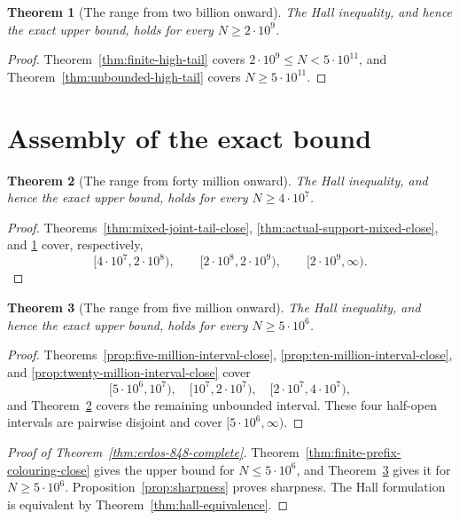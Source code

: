 \documentclass[11pt]{article}
\newtheorem{theorem}{Theorem}[section]
\theoremstyle{definition}
\newcommand{\FiveMillion}{5\cdot10^6}
\newcommand{\TenMillion}{10^7}
\newcommand{\TwentyMillion}{2\cdot10^7}
\newcommand{\FortyMillion}{4\cdot10^7}
\newcommand{\TwoHundredMillion}{2\cdot10^8}
\newcommand{\TwoBillion}{2\cdot10^9}
\newcommand{\FiveHundredBillion}{5\cdot10^{11}}
\begin{document}
\begin{theorem}[The range from two billion onward]\label{thm:formal-high-tail-close}
The Hall inequality, and hence the exact upper bound, holds for every
$N\geq\TwoBillion$.
\end{theorem}

\begin{proof}
Theorem~\ref{thm:finite-high-tail} covers
$\TwoBillion\leq N<\FiveHundredBillion$, and
Theorem~\ref{thm:unbounded-high-tail} covers
$N\geq\FiveHundredBillion$.
\end{proof}

\section{Assembly of the exact bound}

\begin{theorem}[The range from forty million onward]
\label{thm:forty-million-tail-assembly}
The Hall inequality, and hence the exact upper bound, holds for every
$N\geq\FortyMillion$.
\end{theorem}

\begin{proof}
Theorems~\ref{thm:mixed-joint-tail-close},
\ref{thm:actual-support-mixed-close}, and
\ref{thm:formal-high-tail-close} cover, respectively,
\[
 [\FortyMillion,\TwoHundredMillion),\qquad
 [\TwoHundredMillion,\TwoBillion),\qquad
 [\TwoBillion,\infty).
\]
\end{proof}

\begin{theorem}[The range from five million onward]
\label{thm:mixed-cell-five-million-close}
The Hall inequality, and hence the exact upper bound, holds for every
$N\geq\FiveMillion$.
\end{theorem}

\begin{proof}
Theorems~\ref{prop:five-million-interval-close},
\ref{prop:ten-million-interval-close}, and
\ref{prop:twenty-million-interval-close} cover
\[
 [\FiveMillion,\TenMillion),\quad
 [\TenMillion,\TwentyMillion),\quad
 [\TwentyMillion,\FortyMillion),
\]
and Theorem~\ref{thm:forty-million-tail-assembly} covers the remaining
unbounded interval.  These four half-open intervals are pairwise disjoint and
cover $[\FiveMillion,\infty)$.
\end{proof}

\begin{proof}[Proof of Theorem~\ref{thm:erdos-848-complete}]
Theorem~\ref{thm:finite-prefix-colouring-close} gives the upper bound for
$N\leq\FiveMillion$, and
Theorem~\ref{thm:mixed-cell-five-million-close} gives it for
 $N\geq\FiveMillion$.  Proposition~\ref{prop:sharpness} proves sharpness.
The Hall formulation is equivalent by
Theorem~\ref{thm:hall-equivalence}.
\end{proof}
\end{document}

